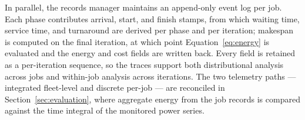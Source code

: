 In parallel, the records manager maintains an append-only event log per job.
Each phase contributes arrival, start, and finish stamps, from which waiting
time, service time, and turnaround are derived per phase and per iteration;
makespan is computed on the final iteration, at which point
Equation~\eqref{eq:energy} is evaluated and the energy and cost fields are
written back. Every field is retained as a per-iteration sequence, so the
traces support both distributional analysis across jobs and within-job analysis
across iterations. The two telemetry paths --- integrated fleet-level and
discrete per-job --- are reconciled in Section~\ref{sec:evaluation}, where
aggregate energy from the job records is compared against the time integral of
the monitored power series.
